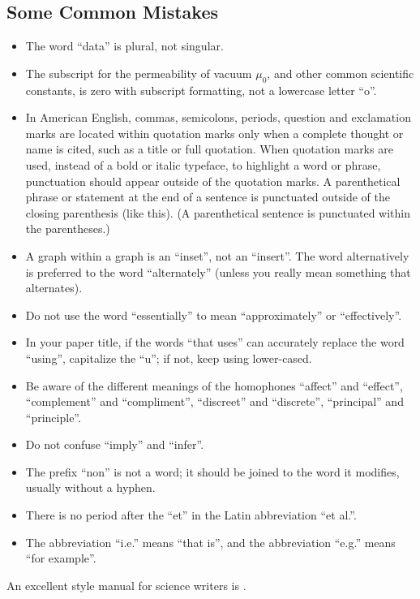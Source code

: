 \documentclass[conference]{IEEEtran}
\begin{document}
\subsection{Some Common Mistakes}\label{SCM}
\begin{itemize}
\item The word ``data'' is plural, not singular.
\item The subscript for the permeability of vacuum $\mu_{0}$, and other common scientific constants, is zero with subscript formatting, not a lowercase letter ``o''.
\item In American English, commas, semicolons, periods, question and exclamation marks are located within quotation marks only when a complete thought or name is cited, such as a title or full quotation. When quotation marks are used, instead of a bold or italic typeface, to highlight a word or phrase, punctuation should appear outside of the quotation marks. A parenthetical phrase or statement at the end of a sentence is punctuated outside of the closing parenthesis (like this). (A parenthetical sentence is punctuated within the parentheses.)
\item A graph within a graph is an ``inset'', not an ``insert''. The word alternatively is preferred to the word ``alternately'' (unless you really mean something that alternates).
\item Do not use the word ``essentially'' to mean ``approximately'' or ``effectively''.
\item In your paper title, if the words ``that uses'' can accurately replace the word ``using'', capitalize the ``u''; if not, keep using lower-cased.
\item Be aware of the different meanings of the homophones ``affect'' and ``effect'', ``complement'' and ``compliment'', ``discreet'' and ``discrete'', ``principal'' and ``principle''.
\item Do not confuse ``imply'' and ``infer''.
\item The prefix ``non'' is not a word; it should be joined to the word it modifies, usually without a hyphen.
\item There is no period after the ``et'' in the Latin abbreviation ``et al.''.
\item The abbreviation ``i.e.'' means ``that is'', and the abbreviation ``e.g.'' means ``for example''.
\end{itemize}
An excellent style manual for science writers is \cite{b7}.
\end{document}
